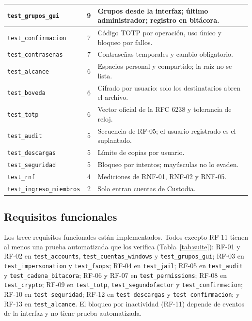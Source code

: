 \documentclass[conference]{IEEEtran}
\begin{document}
\begin{table}[!t]
\begin{tabular}{|>{\scriptsize}p{3.3cm}|c|p{13.2cm}|}
\hline
\texttt{test\_grupos\_gui} & 9 & Grupos desde la interfaz; último administrador; registro en bitácora. \\
\hline
\texttt{test\_confirmacion} & 7 & Código TOTP por operación, uso único y bloqueo por fallos. \\
\hline
\texttt{test\_contrasenas} & 7 & Contraseñas temporales y cambio obligatorio. \\
\hline
\texttt{test\_alcance} & 6 & Espacios personal y compartido; la raíz no se lista. \\
\hline
\texttt{test\_boveda} & 6 & Cifrado por usuario: solo los destinatarios abren el archivo. \\
\hline
\texttt{test\_totp} & 6 & Vector oficial de la RFC 6238 y tolerancia de reloj. \\
\hline
\texttt{test\_audit} & 5 & Secuencia de RF-05; el usuario registrado es el suplantado. \\
\hline
\texttt{test\_descargas} & 5 & Límite de copias por usuario. \\
\hline
\texttt{test\_seguridad} & 5 & Bloqueo por intentos; mayúsculas no lo evaden. \\
\hline
\texttt{test\_rnf} & 4 & Mediciones de RNF-01, RNF-02 y RNF-05. \\
\hline
\texttt{test\_ingreso\_\allowbreak miembros} & 2 & Solo entran cuentas de Custodia. \\
\hline
\end{tabular}
\end{table}

\subsection{Requisitos funcionales}
Los trece requisitos funcionales están implementados. Todos excepto RF-11 tienen al menos una prueba automatizada que los verifica (Tabla~\ref{tab:suite}): RF-01 y RF-02 en \texttt{test\_accounts}, \texttt{test\_cuentas\_windows} y \texttt{test\_grupos\_gui}; RF-03 en \texttt{test\_impersonation} y \texttt{test\_fsops}; RF-04 en \texttt{test\_jail}; RF-05 en \texttt{test\_audit} y \texttt{test\_cadena\_bitacora}; RF-06 y RF-07 en \texttt{test\_permissions}; RF-08 en \texttt{test\_crypto}; RF-09 en \texttt{test\_totp}, \texttt{test\_segundofactor} y \texttt{test\_confirmacion}; RF-10 en \texttt{test\_seguridad}; RF-12 en \texttt{test\_descargas} y \texttt{test\_confirmacion}; y RF-13 en \texttt{test\_alcance}. El bloqueo por inactividad (RF-11) depende de eventos de la interfaz y no tiene prueba automatizada.
\end{document}
